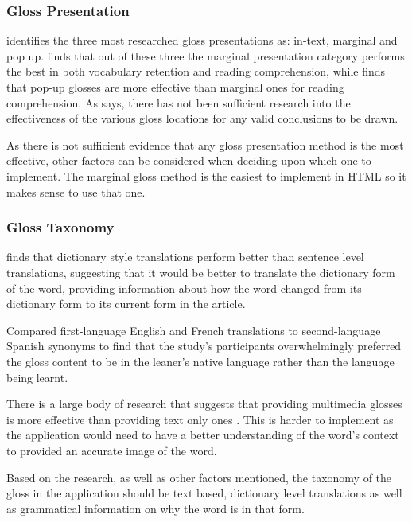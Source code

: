 \subsubsection{Gloss Presentation}

\textcite{chen2016} identifies the three most researched gloss presentations as: in-text, marginal and pop up.  \textcite{abuseileek2008} finds that out of these three the marginal presentation category performs the best in both vocabulary retention and reading comprehension, while \textcite{marefat2016} finds that pop-up glosses are more effective than marginal ones for reading comprehension. As \textcite{chen2016} says, there has not been sufficient research into the effectiveness of the various gloss locations for any valid conclusions to be drawn.

As there is not sufficient evidence that any gloss presentation method is the most effective, other factors can be considered when deciding upon which one to implement. The marginal gloss method is the easiest to implement in HTML so it makes sense to use that one. 

\subsubsection{Gloss Taxonomy}

\textcite{gettys2001} finds that dictionary style translations perform better than sentence level translations, suggesting that it would be better
 to translate the dictionary form of the word, providing information about how the word changed from its dictionary form to its current form in the article. 

\textcite{bell2000}  Compared first-language English and French translations to second-language Spanish synonyms to find that the study's participants overwhelmingly preferred the gloss content to be in the leaner's native language rather than the language being learnt. 

There is a large body of research that suggests that providing multimedia glosses is more effective than providing text only ones \autocite{yoshii2006, kost1999}. This is harder to implement  as the application would need to have a better understanding of the word's context to provided an accurate image of the word.

Based on the research, as well as other factors mentioned, the taxonomy of the gloss in the application should be text based, dictionary level translations as well as grammatical information on why the word is in that form. 

